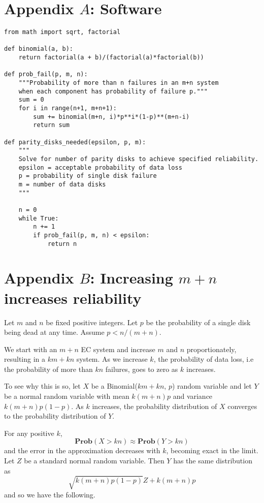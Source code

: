 \documentclass[11pt]{article}
\begin{document}
\section{Appendix $A$: Software} 

\begin{verbatim}
from math import sqrt, factorial

def binomial(a, b):
    return factorial(a + b)/(factorial(a)*factorial(b))

def prob_fail(p, m, n):
    """Probability of more than n failures in an m+n system 
    when each component has probability of failure p."""
    sum = 0
    for i in range(n+1, m+n+1):
        sum += binomial(m+n, i)*p**i*(1-p)**(m+n-i)
        return sum

def parity_disks_needed(epsilon, p, m):
    """
    Solve for number of parity disks to achieve specified reliability.
    epsilon = acceptable probability of data loss
    p = probability of single disk failure
    m = number of data disks
    """

    n = 0
    while True:
        n += 1
        if prob_fail(p, m, n) < epsilon:
            return n  
\end{verbatim}

\section{Appendix $B$: Increasing $m+n$ increases reliability} 

Let $m$ and $n$ be fixed positive integers. Let $p$ be the probability of a single disk being dead at any time. Assume $p < n/(m+n)$.

We start with an $m+n$ EC system and increase $m$ and $n$ proportionately, resulting in a $km + kn$ system. As we increase $k$, the probability of data loss, i.e the probability of more than $kn$ failures, goes to zero as $k$ increases.

To see why this is so, let $X$ be a Binomial($km + kn$, $p$) random variable and let $Y$ be a normal random variable with mean $k(m+n)p$ and variance $k(m+n)p(1-p)$. As $k$ increases, the probability distribution of $X$ converges to the probability distribution of $Y$. 

For any positive $k$, 
\[ \mathbf{Prob}(X > kn) \approx \mathbf{Prob}(Y > kn) \]
and the error in the approximation decreases with $k$, becoming exact in the limit. Let $Z$ be a standard normal random variable. Then $Y$ has the same distribution as 
\[\sqrt{k(m+n)p(1-p)} Z  + k(m+n)p\]
and so we have the following.
\end{document}
